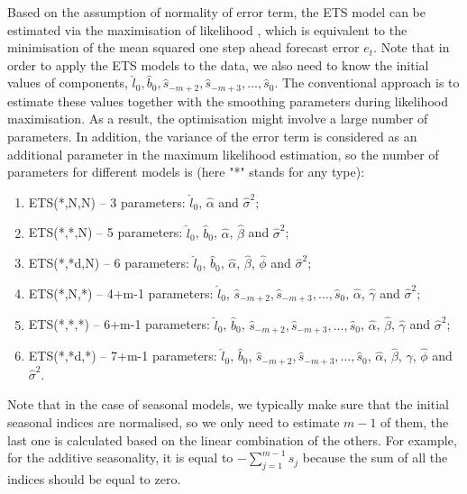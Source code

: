 \documentclass[
]{book}
\providecommand{\tightlist}{%
  \setlength{\itemsep}{0pt}\setlength{\parskip}{0pt}}
\theoremstyle{definition}
\theoremstyle{definition}
\theoremstyle{definition}
\theoremstyle{definition}
\theoremstyle{remark}
\begin{document}
Based on the assumption of normality of error term, the ETS model can be estimated via the maximisation of likelihood \citep[see Chapter 13 of][]{SvetunkovSBA}, which is equivalent to the minimisation of the mean squared one step ahead forecast error \(e_t\). Note that in order to apply the ETS models to the data, we also need to know the initial values of components, \(\hat{l}_0, \hat{b}_0, \hat{s}_{-m+2}, \hat{s}_{-m+3}, \dots, \hat{s}_{0}\). The conventional approach is to estimate these values together with the smoothing parameters during likelihood maximisation. As a result, the optimisation might involve a large number of parameters. In addition, the variance of the error term is considered as an additional parameter in the maximum likelihood estimation, so the number of parameters for different models is (here "*" stands for any type):

\begin{enumerate}
\def\labelenumi{\arabic{enumi}.}
\tightlist
\item
  ETS(*,N,N) -- 3 parameters: \(\hat{l}_0\), \(\hat{\alpha}\) and \(\hat{\sigma}^2\);
\item
  ETS(*,*,N) -- 5 parameters: \(\hat{l}_0\), \(\hat{b}_0\), \(\hat{\alpha}\), \(\hat{\beta}\) and \(\hat{\sigma}^2\);
\item
  ETS(*,*d,N) -- 6 parameters: \(\hat{l}_0\), \(\hat{b}_0\), \(\hat{\alpha}\), \(\hat{\beta}\), \(\hat{\phi}\) and \(\hat{\sigma}^2\);
\item
  ETS(*,N,*) -- 4+m-1 parameters: \(\hat{l}_0\), \(\hat{s}_{-m+2}, \hat{s}_{-m+3}, \dots, \hat{s}_{0}\), \(\hat{\alpha}\), \(\hat{\gamma}\) and \(\hat{\sigma}^2\);
\item
  ETS(*,*,*) -- 6+m-1 parameters: \(\hat{l}_0\), \(\hat{b}_0\), \(\hat{s}_{-m+2}, \hat{s}_{-m+3}, \dots, \hat{s}_{0}\), \(\hat{\alpha}\), \(\hat{\beta}\), \(\hat{\gamma}\) and \(\hat{\sigma}^2\);
\item
  ETS(*,*d,*) -- 7+m-1 parameters: \(\hat{l}_0\), \(\hat{b}_0\), \(\hat{s}_{-m+2}, \hat{s}_{-m+3}, \dots, \hat{s}_{0}\), \(\hat{\alpha}\), \(\hat{\beta}\), \(\hat{\gamma}\), \(\hat{\phi}\) and \(\hat{\sigma}^2\).
\end{enumerate}

Note that in the case of seasonal models, we typically make sure that the initial seasonal indices are normalised, so we only need to estimate \(m-1\) of them, the last one is calculated based on the linear combination of the others. For example, for the additive seasonality, it is equal to \(-\sum_{j=1}^{m-1} s_j\) because the sum of all the indices should be equal to zero.
\end{document}
